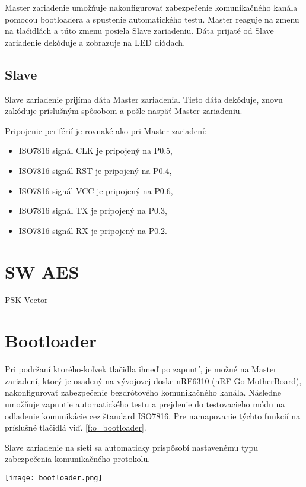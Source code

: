 \documentclass[12pt,a4wide,oneside,openright]{report}
\begin{document}
	Master zariadenie umožňuje nakonfigurovať zabezpečenie komunikačného kanála pomocou bootloadera a spustenie automatického testu. 
	Master reaguje na zmenu na tlačidlách a túto zmenu posiela Slave zariadeniu. 
	Dáta prijaté od Slave zariadenie dekóduje a zobrazuje na LED diódach.

\subsection{Slave}
	Slave zariadenie prijíma dáta Master zariadenia. Tieto dáta dekóduje, znovu zakóduje príslušným spôsobom a pošle naspäť Master zariadeniu.
	
	
	Pripojenie periférií je rovnaké ako pri Master zariadení:
	\begin{itemize}
		\item ISO7816 signál CLK je pripojený na P0.5,
		\item ISO7816 signál RST je pripojený na P0.4,
		\item ISO7816 signál VCC je pripojený na P0.6,
		\item ISO7816 signál TX je pripojený na P0.3,
		\item ISO7816 signál RX je pripojený na P0.2.
	\end{itemize}

\section{SW AES}
PSK
Vector

\section{Bootloader}
	\label{bootloader}
	Pri podržaní ktorého-koľvek tlačidla ihneď po zapnutí, je možné na Master zariadení, ktorý je osadený na vývojovej doske nRF6310 (nRF Go MotherBoard), nakonfigurovať zabezpečenie bezdrôtového komunikačného kanála. Následne umožňuje zapnutie automatického testu a prejdenie do testovacieho módu na odladenie komunikácie cez štandard ISO7816.
Pre namapovanie týchto funkcií na príslušné tlačidlá viď. \ref{f:o_bootloader}.
	
	Slave zariadenie na sieti sa automaticky prispôsobí nastavenému typu zabezpečenia komunikačného protokolu.
\begin{figure*}[!htb]
	\centering
	\texttt{[image: bootloader.png]}
	\caption{Konfigurácia nastavení po zapnutí\cite{nrfug}.}
	\label{f:o_bootloader}
\end{figure*}
\end{document}

